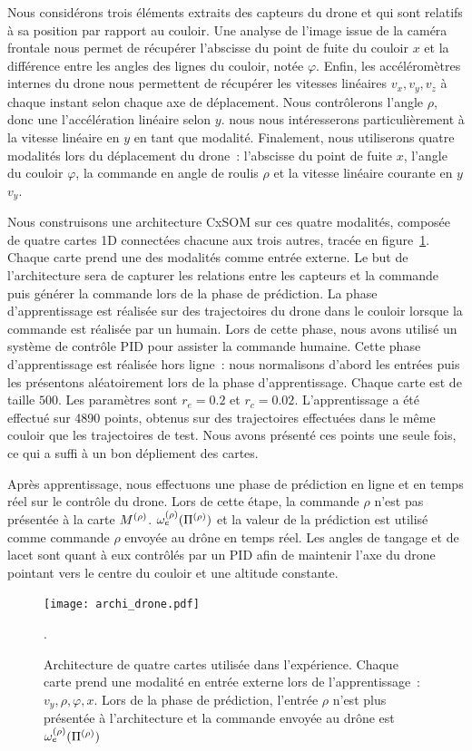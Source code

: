 \documentclass[../main]{subfiles}
\begin{document}
Nous considérons trois éléments extraits des capteurs du drone et qui sont relatifs à sa position par rapport au couloir. Une analyse de l'image issue de la caméra frontale nous permet de récupérer l'abscisse du point de fuite du couloir $x$ et la différence entre les angles des lignes du couloir, notée $\varphi$.
Enfin, les accéléromètres internes du drone nous permettent de récupérer les vitesses linéaires $v_x,v_y,v_z$ à chaque instant selon chaque axe de déplacement. 
Nous contrôlerons l'angle $\rho$, donc une l'accélération linéaire selon $y$. nous nous intéresserons particulièrement à la vitesse linéaire en $y$ en tant que modalité.
Finalement, nous utiliserons quatre modalités lors du déplacement du drone~: l'abscisse du point de fuite $x$, l'angle du couloir $\varphi$, la commande en angle de roulis $\rho$ et la vitesse linéaire courante en $y$ $v_y$.


Nous construisons une architecture CxSOM sur ces quatre modalités, composée de quatre cartes 1D connectées chacune aux trois autres, tracée en figure~\ref{fig:archi_drone}. Chaque carte prend une des modalités comme entrée externe.
Le but de l'architecture sera de capturer les relations entre les capteurs et la commande puis générer la commande lors de la phase de prédiction.
La phase d'apprentissage est réalisée sur des trajectoires du drone dans le couloir lorsque la commande est réalisée par un humain.
Lors de cette phase, nous avons utilisé un système de contrôle PID pour assister la commande humaine. 
Cette phase d'apprentissage est réalisée hors ligne~: nous normalisons d'abord les entrées puis les présentons aléatoirement lors de la phase d'apprentissage.
Chaque carte est de taille $500$. Les paramètres sont $r_e = 0.2$ et $r_c = 0.02$.
L'apprentissage a été effectué sur 4890 points, obtenus sur des trajectoires effectuées dans le même couloir que les trajectoires de test. Nous avons présenté ces points une seule fois, ce qui a suffi à un bon dépliement des cartes.


Après apprentissage, nous effectuons une phase de prédiction en ligne et en temps réel sur le contrôle du drone.
Lors de cette étape, la commande $\rho$ n'est pas présentée à la carte $M^{({\rho})}$. $\omega_e^{({\rho})}(\Pi^{({\rho})})$ et la valeur de la prédiction est utilisé comme commande $\rho$ envoyée au drône en temps réel.
Les angles de tangage et de lacet sont quant à eux contrôlés par un PID afin de maintenir l'axe du drone pointant vers le centre du couloir et une altitude constante.

\begin{figure}
	\centering\texttt{[image: archi\_drone.pdf]}
	\caption{Architecture de quatre cartes utilisée dans l'expérience. Chaque carte prend une modalité en entrée externe lors de l'apprentissage~: $v_y,\rho,\varphi,x$. Lors de la phase de prédiction, l'entrée $\rho$ n'est plus présentée à l'architecture et la commande envoyée au drône est $\omega_e^{({\rho})}(\Pi^{({\rho})})$\label{fig:archi_drone}}.
\end{figure}
\end{document}
